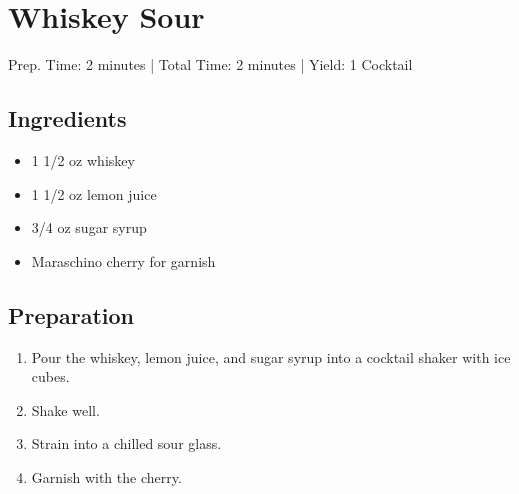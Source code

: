 \section{Whiskey Sour}

\begin{center}
Prep. Time: 2 minutes |
Total Time: 2 minutes | 
Yield: 1 Cocktail
\end{center}

\subsection{Ingredients}
\begin{itemize}
    \item 1 1/2 oz whiskey
    \item 1 1/2 oz lemon juice
    \item 3/4 oz sugar syrup
    \item Maraschino cherry for garnish
\end{itemize}

\subsection{Preparation}
\begin{enumerate}
    \item Pour the whiskey, lemon juice, and sugar syrup into a cocktail shaker with ice cubes.
    \item Shake well.
    \item Strain into a chilled sour glass.
    \item Garnish with the cherry.
\end{enumerate}
